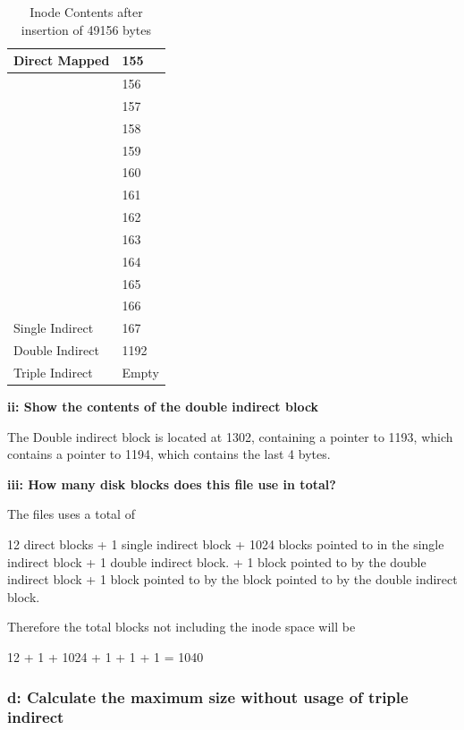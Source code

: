 \documentclass[11pt,a4paper]{article}
\theoremstyle{plain}
\theoremstyle{definition}
\theoremstyle{remark}
\numberwithin{equation}{section}
\begin{document}
\begin{table}[]
    \centering
    \caption{Inode Contents after insertion of 49156 bytes}
    \label{tbl:i}
    \begin{tabular}{l|l|}
        \hline
        \multicolumn{1}{|l|}{Direct Mapped}   & 155   \\ \hline
        & 156   \\ \cline{2-2} 
        & 157   \\ \cline{2-2} 
        & 158   \\ \cline{2-2} 
        & 159   \\ \cline{2-2} 
        & 160   \\ \cline{2-2} 
        & 161   \\ \cline{2-2} 
        & 162   \\ \cline{2-2} 
        & 163   \\ \cline{2-2} 
        & 164   \\ \cline{2-2} 
        & 165   \\ \cline{2-2} 
        & 166   \\ \hline
        \multicolumn{1}{|l|}{Single Indirect} & 167   \\ \hline
        \multicolumn{1}{|l|}{Double Indirect} & 1192  \\ \hline
        \multicolumn{1}{|l|}{Triple Indirect} & Empty \\ \hline
    \end{tabular}
\end{table}


\textbf{ii: Show the contents of the double indirect block}

The Double indirect block is located at 1302, containing a pointer to 1193, which contains a pointer to 1194, which contains the last 4 bytes.

\textbf{iii: How many disk blocks does this file use in total?}

The files uses a total of

12 direct blocks +
1 single indirect block + 1024 blocks pointed to in the single indirect block +
1 double indirect block. + 1 block pointed to by the double indirect block +
1 block pointed to by the block pointed to by the double indirect block.

Therefore the total blocks not including the inode space will be

12 + 1 + 1024 + 1 + 1 + 1 = 1040

\subsubsection*{d: Calculate the maximum size without usage of triple indirect}
\end{document}
